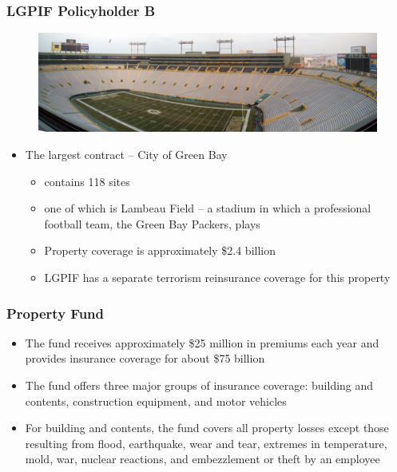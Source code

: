 \documentclass[serif,10pt]{beamer}
\begin{document}
\begin{frame}%
\frametitle{LGPIF Policyholder B}
\begin{figure}[t]
  \begin{center}
\includegraphics[scale = 0.25, bb = 300 300 600 300]{Figures/2009_pan_2_large.jpg}
  \end{center}
\end{figure}
  \begin{itemize}

  \vspace{1in}

\item The largest contract -- City of Green Bay \vspace{2mm}
  \begin{itemize}
\item contains 118 sites \vspace{2mm}
\item one of which is Lambeau Field  -- a stadium in which a professional football team, the Green Bay Packers,
plays \vspace{2mm}
\item Property coverage is approximately \$2.4 billion \vspace{2mm}
\item LGPIF has a separate terrorism reinsurance coverage for this property
\end{itemize}\end{itemize}
\end{frame}

\begin{frame}
\frametitle{Property Fund}
  \begin{itemize}
\item The fund receives approximately \$25 million in premiums each year and provides insurance coverage for about \$75
billion \vspace{2mm}
\item The fund offers three major groups of insurance coverage: building and contents, construction equipment, and motor
vehicles \vspace{2mm}
    \item For building and contents, the fund covers all property losses except those resulting from flood, earthquake, wear and tear, extremes in temperature, mold, war, nuclear reactions, and embezzlement or theft by an employee
\end{itemize}
\end{frame}
\end{document}
